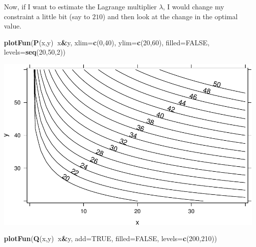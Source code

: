 \documentclass[
]{book}
\newenvironment{Shaded}{\begin{snugshade}}{\end{snugshade}}
\newcommand{\DataTypeTok}[1]{\textcolor[rgb]{0.13,0.29,0.53}{#1}}
\newcommand{\DecValTok}[1]{\textcolor[rgb]{0.00,0.00,0.81}{#1}}
\newcommand{\KeywordTok}[1]{\textcolor[rgb]{0.13,0.29,0.53}{\textbf{#1}}}
\newcommand{\NormalTok}[1]{#1}
\newcommand{\OperatorTok}[1]{\textcolor[rgb]{0.81,0.36,0.00}{\textbf{#1}}}
\newcommand{\OtherTok}[1]{\textcolor[rgb]{0.56,0.35,0.01}{#1}}
\begin{document}
Now, if I want to estimate the Lagrange multiplier \(\lambda\), I would change my constraint a little bit (say to \(210\)) and then look at the change in the optimal value.

\begin{Shaded}
\begin{Highlighting}[]
\KeywordTok{plotFun}\NormalTok{(}\KeywordTok{P}\NormalTok{(x,y)}\OperatorTok{~}\NormalTok{x}\OperatorTok{&}\NormalTok{y, }\DataTypeTok{xlim=}\KeywordTok{c}\NormalTok{(}\DecValTok{0}\NormalTok{,}\DecValTok{40}\NormalTok{), }\DataTypeTok{ylim=}\KeywordTok{c}\NormalTok{(}\DecValTok{20}\NormalTok{,}\DecValTok{60}\NormalTok{), }\DataTypeTok{filled=}\OtherTok{FALSE}\NormalTok{, }\DataTypeTok{levels=}\KeywordTok{seq}\NormalTok{(}\DecValTok{20}\NormalTok{,}\DecValTok{50}\NormalTok{,}\DecValTok{2}\NormalTok{))}
\end{Highlighting}
\end{Shaded}

\includegraphics{_bookdown_files/math135_handbook_files/figure-latex/unnamed-chunk-55-1.pdf}

\begin{Shaded}
\begin{Highlighting}[]
\KeywordTok{plotFun}\NormalTok{(}\KeywordTok{Q}\NormalTok{(x,y)}\OperatorTok{~}\NormalTok{x}\OperatorTok{&}\NormalTok{y, }\DataTypeTok{add=}\OtherTok{TRUE}\NormalTok{, }\DataTypeTok{filled=}\OtherTok{FALSE}\NormalTok{, }\DataTypeTok{levels=}\KeywordTok{c}\NormalTok{(}\DecValTok{200}\NormalTok{,}\DecValTok{210}\NormalTok{))}
\end{Highlighting}
\end{Shaded}
\end{document}
